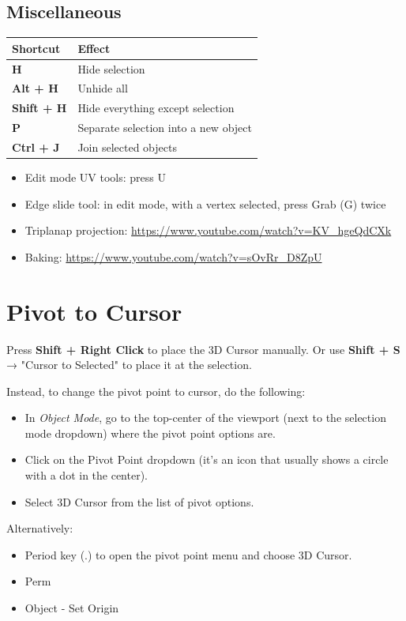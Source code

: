 \documentclass{article}
\begin{document}
\subsection{Miscellaneous}

\begin{longtable}{ll}
    \toprule
    \textbf{Shortcut}  & \textbf{Effect}                      \\
    \midrule
    \endhead
    \bottomrule
    \endfoot

    \textbf{H}         & Hide selection                       \\
    \textbf{Alt + H}   & Unhide all                           \\
    \textbf{Shift + H} & Hide everything except selection     \\
    \textbf{P}         & Separate selection into a new object \\
    \textbf{Ctrl + J}  & Join selected objects                \\
\end{longtable}

\begin{itemize}[topsep=0pt, noitemsep]
    \item Edit mode UV tools: press U
    \item Edge slide tool: in edit mode, with a vertex selected, press Grab (G) twice
    \item Triplanap projection: \href{https://www.youtube.com/watch?v=KV_hgeQdCXk}{https://www.youtube.com/watch?v=KV\_hgeQdCXk}
    \item Baking: \href{https://www.youtube.com/watch?v=sOvRr_D8ZpU}{https://www.youtube.com/watch?v=sOvRr\_D8ZpU}
\end{itemize}

\section{Pivot to Cursor}
Press \textbf{Shift + Right Click} to place the 3D Cursor manually.  Or use \textbf{Shift + S} → "Cursor to Selected" to place it at the selection.\par
Instead, to change the pivot point to cursor, do the following:
\begin{itemize}[topsep=0pt, noitemsep]
    \item In \textit{Object Mode}, go to the top-center of the viewport (next to the selection mode dropdown) where the pivot point options are.
    \item Click on the Pivot Point dropdown (it's an icon that usually shows a circle with a dot in the center).
    \item Select 3D Cursor from the list of pivot options.
\end{itemize}
Alternatively:
\begin{itemize}[topsep=0pt, noitemsep]
    \item Period key (.) to open the pivot point menu and choose 3D Cursor.
    \item Perm
    \item Object - Set Origin
\end{itemize}
\end{document}

